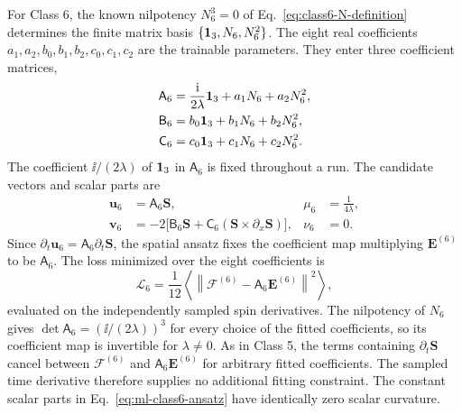 For Class 6, the known nilpotency $N_6^3=0$ of
Eq.~\eqref{eq:class6-N-definition} determines the finite matrix basis
$\{\mathbf{1}_3,N_6,N_6^2\}$.  The eight real coefficients
$a_1,a_2,b_0,b_1,b_2,c_0,c_1,c_2$ are the trainable parameters.
They enter three coefficient matrices,
\begin{align}
\mathsf A_6&=\frac{\mathrm{i}}{2\lambda}\mathbf{1}_3+a_1N_6+a_2N_6^2,
\nonumber\\
\mathsf B_6&=b_0\mathbf{1}_3+b_1N_6+b_2N_6^2,
\nonumber\\
\mathsf C_6&=c_0\mathbf{1}_3+c_1N_6+c_2N_6^2.
\label{eq:ml-class6-matrices}
\end{align}
The coefficient $\ii/(2\lambda)$ of $\mathbf{1}_3$ in $\mathsf A_6$ is
fixed throughout a run.
The candidate vectors and scalar parts are
\begin{align}
\boldsymbol u_6&=\mathsf A_6\boldsymbol S,
&\mu_6&=\frac{1}{4\lambda},
\nonumber\\
\boldsymbol v_6&=-2\bigl[\mathsf B_6\boldsymbol S
 +\mathsf C_6(\boldsymbol S\times\partial_x\boldsymbol S)\bigr],
&\nu_6&=0.
\label{eq:ml-class6-ansatz}
\end{align}
Since $\partial_t\boldsymbol u_6=\mathsf A_6\partial_t\boldsymbol S$,
the spatial ansatz fixes the coefficient map multiplying
$\boldsymbol E^{(6)}$ to be $\mathsf A_6$.  The loss minimized over
the eight coefficients is
\begin{equation}
\mathcal L_6
=\frac{1}{12}\left\langle\left\|
\boldsymbol{\mathcal F}^{(6)}-\mathsf A_6\boldsymbol E^{(6)}
\right\|^2\right\rangle,
\label{eq:ml-class6-loss}
\end{equation}
evaluated on the independently sampled spin derivatives.  The nilpotency
of $N_6$ gives
$\det\mathsf A_6=(\ii/(2\lambda))^3$ for every choice of the fitted
coefficients, so its coefficient map is invertible for $\lambda\ne0$.
As in Class 5, the terms containing $\partial_t\boldsymbol S$ cancel
between $\boldsymbol{\mathcal F}^{(6)}$ and
$\mathsf A_6\boldsymbol E^{(6)}$ for arbitrary fitted coefficients.
The sampled time derivative therefore supplies no additional fitting
constraint.  The constant scalar parts in
Eq.~\eqref{eq:ml-class6-ansatz} have identically zero scalar curvature.


